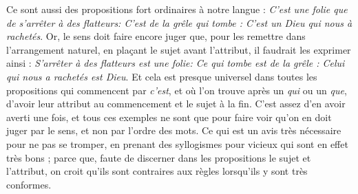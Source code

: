 Ce sont aussi des propositions fort ordinaires à notre langue : \emph{C'est une folie que de s'arrêter à des flatteurs: C'est de la grêle qui tombe : C'est un Dieu qui nous à rachetés}. Or, le sens doit faire encore juger que, pour les remettre dans l'arrangement naturel, en plaçant le sujet avant l'attribut, il faudrait les exprimer ainsi : \emph{S'arrêter à des flatteurs est une folie: Ce qui tombe est de la grêle : Celui qui nous a rachetés est Dieu}. Et cela est presque universel dans toutes les propositions qui commencent par \emph{c'est}, et où l'on trouve après un \emph{qui} ou un \emph{que}, d'avoir leur attribut au commencement et le sujet à la fin. C'est assez d'en avoir averti une fois, et tous ces exemples ne sont que pour faire voir qu'on en doit juger par le sens, et non par l'ordre des mots. Ce qui est un avis très nécessaire pour ne pas se tromper, en prenant des syllogismes pour vicieux qui sont en effet très bons ; parce que, faute de discerner dans les propositions le sujet et l'attribut, on croit qu'ils sont contraires aux règles lorsqu'ils y sont très conformes.



